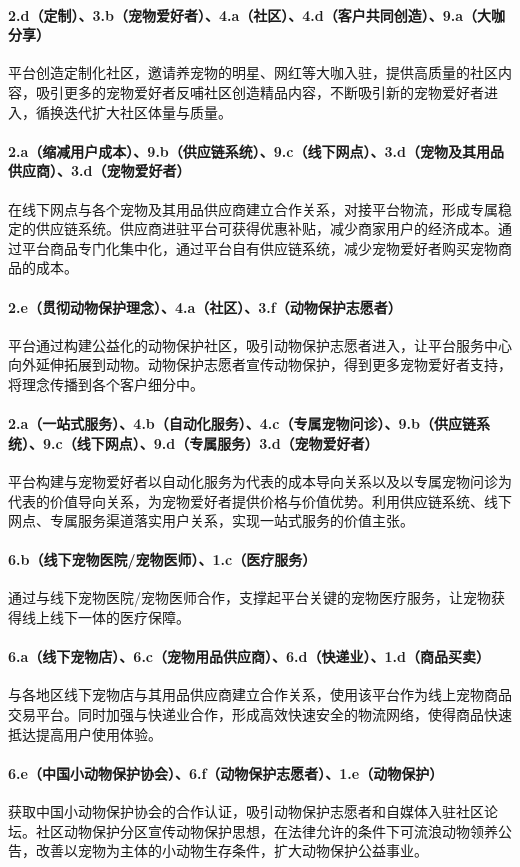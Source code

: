 \documentclass[a4paper]{ctexart}
\begin{document}
\paragraph{2.d（定制）、3.b（宠物爱好者）、4.a（社区）、4.d（客户共同创造）、9.a（大咖分享）}平台创造定制化社区，邀请养宠物的明星、网红等大咖入驻，提供高质量的社区内容，吸引更多的宠物爱好者反哺社区创造精品内容，不断吸引新的宠物爱好者进入，循换迭代扩大社区体量与质量。
\paragraph{2.a（缩减用户成本）、9.b（供应链系统）、9.c（线下网点）、3.d（宠物及其用品供应商）、3.d（宠物爱好者）}在线下网点与各个宠物及其用品供应商建立合作关系，对接平台物流，形成专属稳定的供应链系统。供应商进驻平台可获得优惠补贴，减少商家用户的经济成本。通过平台商品专门化集中化，通过平台自有供应链系统，减少宠物爱好者购买宠物商品的成本。
\paragraph{2.e（贯彻动物保护理念）、4.a（社区）、3.f（动物保护志愿者）}平台通过构建公益化的动物保护社区，吸引动物保护志愿者进入，让平台服务中心向外延伸拓展到动物。动物保护志愿者宣传动物保护，得到更多宠物爱好者支持，将理念传播到各个客户细分中。
\paragraph{2.a（一站式服务）、4.b（自动化服务）、4.c（专属宠物问诊）、9.b（供应链系统）、9.c（线下网点）、9.d（专属服务）3.d（宠物爱好者）}平台构建与宠物爱好者以自动化服务为代表的成本导向关系以及以专属宠物问诊为代表的价值导向关系，为宠物爱好者提供价格与价值优势。利用供应链系统、线下网点、专属服务渠道落实用户关系，实现一站式服务的价值主张。
\paragraph{6.b（线下宠物医院/宠物医师）、1.c（医疗服务）}通过与线下宠物医院/宠物医师合作，支撑起平台关键的宠物医疗服务，让宠物获得线上线下一体的医疗保障。
\paragraph{6.a（线下宠物店）、6.c（宠物用品供应商）、6.d（快递业）、1.d（商品买卖）}与各地区线下宠物店与其用品供应商建立合作关系，使用该平台作为线上宠物商品交易平台。同时加强与快递业合作，形成高效快速安全的物流网络，使得商品快速抵达提高用户使用体验。
\paragraph{6.e（中国小动物保护协会）、6.f（动物保护志愿者）、1.e（动物保护）}获取中国小动物保护协会的合作认证，吸引动物保护志愿者和自媒体入驻社区论坛。社区动物保护分区宣传动物保护思想，在法律允许的条件下可流浪动物领养公告，改善以宠物为主体的小动物生存条件，扩大动物保护公益事业。
\end{document}

